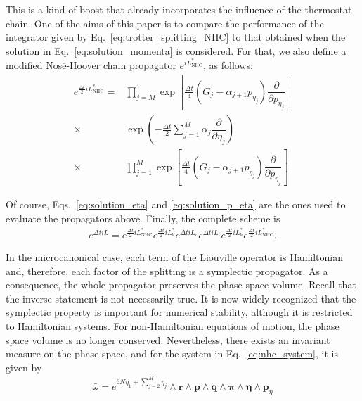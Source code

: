 \documentclass[aip,jcp,reprint,amsmath,amssymb]{revtex4-1}
\newcommand{\vt}[1]{\boldsymbol{\mathbf{#1}}}           %
\newcommand{\diff}[2]{\dfrac{\partial #1}{\partial #2}} %
\begin{document}
This is a kind of boost that already incorporates the influence of the thermostat chain. One of the aims of this paper is to compare the performance of the integrator given by Eq.~\ref{eq:trotter_splitting_NHC} to that obtained when the solution in Eq.~\ref{eq:solution_momenta} is considered. For that, we also define a modified Nos\'e-Hoover chain propagator $e^{i\!L^\ast_\text{NHC}}$, as follows:
\begin{equation}
\begin{split}
e^{\frac{\Delta t}{2} i\!L_\text{NHC}^\ast } = &\prod_{j=M}^1 \exp\left[\frac{\Delta t}{4} \left( G_j - \alpha_{j+1} p_{\eta_j} \right) \diff{}{p_{\eta_j}}\right] \\
\times &\exp\left(-\frac{\Delta t}{2} \sum_{j=1}^M \alpha_j \diff{}{\eta_j}\right) \\
\times &\prod_{j=1}^M \exp\left[\frac{\Delta t}{4} \left( G_j - \alpha_{j+1} p_{\eta_j} \right) \diff{}{p_{\eta_j}}\right]
\end{split}
\end{equation}

Of course, Eqs.~\ref{eq:solution_eta} and \ref{eq:solution_p_eta} are the ones used to evaluate the propagators above. Finally, the complete scheme is
\begin{equation}
\label{eq:modified_splitting}
\begin{split}
e^{\Delta t i\!L} = e^{\frac{\Delta t}{2} i\!L_\text{NHC}^\ast} e^{\frac{\Delta t}{2} i\!L_b^\ast} e^{\Delta t i\!L_r} e^{\Delta t i\!L_t}  e^{\frac{\Delta t}{2} i\!L_b^\ast} e^{\frac{\Delta t}{2} i\!L_\text{NHC}^\ast}.
\end{split}
\end{equation}

In the microcanonical case, each term of the Liouville operator is Hamiltonian and, therefore, each factor of the splitting is a symplectic propagator. As a consequence, the whole propagator preserves the phase-space volume. Recall that the inverse statement is not necessarily true. It is now widely recognized that the symplectic property is important for numerical stability,\cite{Skeel1997} although it is restricted to Hamiltonian systems. For non-Hamiltonian equations of motion, the phase space volume is no longer conserved. Nevertheless, there exists an invariant measure on the phase space, and for the system in Eq.~\ref{eq:nhc_system}, it is given by
\begin{align*}
\bar{\omega} = e^{6N \eta_1 + \sum_{j=2}^M \eta_j} \wedge {\vt r} \wedge {\vt p} \wedge {\vt q} \wedge {\vt \pi} \wedge {\vt \eta} \wedge {\vt p_\eta}
\end{align*}
\end{document}
